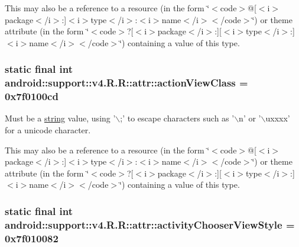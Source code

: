 This may also be a reference to a resource (in the form \char`\"{}$<$code$>$@\mbox{[}$<$i$>$package$<$/i$>$:\mbox{]}$<$i$>$type$<$/i$>$:$<$i$>$name$<$/i$>$$<$/code$>$\char`\"{}) or theme attribute (in the form \char`\"{}$<$code$>$?\mbox{[}$<$i$>$package$<$/i$>$:\mbox{]}\mbox{[}$<$i$>$type$<$/i$>$:\mbox{]}$<$i$>$name$<$/i$>$$<$/code$>$\char`\"{}) containing a value of this type. \hypertarget{classandroid_1_1support_1_1v4_1_1_r_1_1attr_e8e12aa0100c286bdcb37365452d7636}{
\subsubsection[{actionViewClass}]{\setlength{\rightskip}{0pt plus 5cm}static final int android::support::v4.R.R::attr::actionViewClass = 0x7f0100cd}}
\label{classandroid_1_1support_1_1v4_1_1_r_1_1attr_e8e12aa0100c286bdcb37365452d7636}


Must be a \hyperlink{classandroid_1_1support_1_1v4_1_1_r_1_1string}{string} value, using '$\backslash$;' to escape characters such as '$\backslash$n' or '$\backslash$uxxxx' for a unicode character. 

This may also be a reference to a resource (in the form \char`\"{}$<$code$>$@\mbox{[}$<$i$>$package$<$/i$>$:\mbox{]}$<$i$>$type$<$/i$>$:$<$i$>$name$<$/i$>$$<$/code$>$\char`\"{}) or theme attribute (in the form \char`\"{}$<$code$>$?\mbox{[}$<$i$>$package$<$/i$>$:\mbox{]}\mbox{[}$<$i$>$type$<$/i$>$:\mbox{]}$<$i$>$name$<$/i$>$$<$/code$>$\char`\"{}) containing a value of this type. \hypertarget{classandroid_1_1support_1_1v4_1_1_r_1_1attr_526f9d9a2b7368052d192159f3e628d5}{
\subsubsection[{activityChooserViewStyle}]{\setlength{\rightskip}{0pt plus 5cm}static final int android::support::v4.R.R::attr::activityChooserViewStyle = 0x7f010082}}
\label{classandroid_1_1support_1_1v4_1_1_r_1_1attr_526f9d9a2b7368052d192159f3e628d5}


